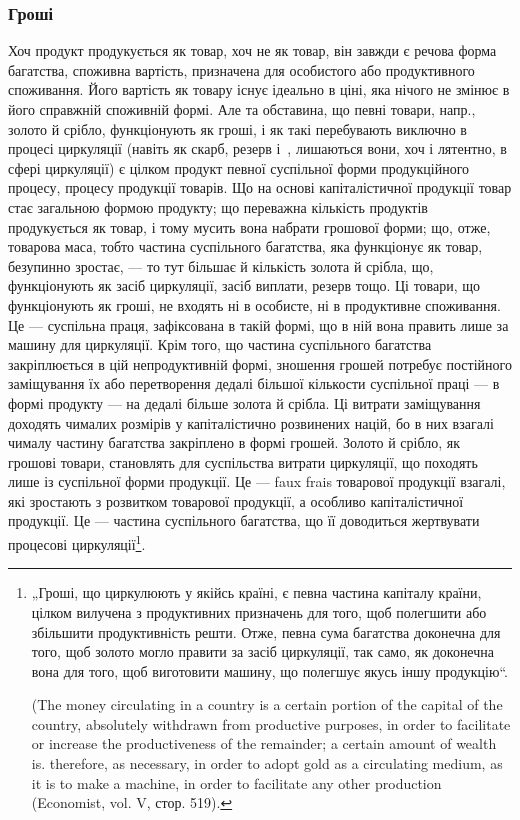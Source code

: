 \subsubsection{Гроші}

Хоч продукт продукується як товар, хоч не як товар, він завжди є
речова форма багатства, споживна вартість, призначена для особистого
або продуктивного споживання. Його вартість як товару існує ідеально
в ціні, яка нічого не змінює в його справжній споживній формі. Але та
обставина, що певні товари, напр., золото й срібло, функціонують як
гроші, і як такі перебувають виключно в процесі циркуляції (навіть як
скарб, резерв і~, лишаються вони, хоч і лятентно, в сфері
циркуляції) є цілком продукт певної суспільної форми продукційного
процесу, процесу продукції товарів. Що на основі капіталістичної продукції
товар стає загальною формою продукту; що переважна кількість
продуктів продукується як товар, і тому мусить вона набрати грошової
форми; що, отже, товарова маса, тобто частина суспільного багатства,
яка функціонує як товар, безупинно зростає, — то тут більшає й кількість
золота й срібла, що, функціонують як засіб циркуляції, засіб виплати,
резерв тощо. Ці товари, що функціонують як гроші, не входять ні в
особисте, ні в продуктивне споживання. Це — суспільна праця, зафіксована
в такій формі, що в ній вона править лише за машину для циркуляції.
Крім того, що частина суспільного багатства закріплюється в цій
непродуктивній формі, зношення грошей потребує постійного заміщування
їх або перетворення дедалі більшої кількости суспільної праці — в
формі продукту — на дедалі більше золота й срібла. Ці витрати заміщування
доходять чималих розмірів у капіталістично розвинених націй, бо
в них взагалі чималу частину багатства закріплено в формі грошей.
Золото й срібло, як грошові товари, становлять для суспільства витрати
циркуляції, що походять лише із суспільної форми продукції. Це — faux frais
товарової продукції взагалі, які зростають з розвитком товарової продукції,
а особливо капіталістичної продукції. Це — частина суспільного
багатства, що її доводиться жертвувати процесові циркуляції\footnote{
„Гроші, що циркулюють у якійсь країні, є певна частина капіталу
країни, цілком вилучена з продуктивних призначень для того, щоб полегшити
або збільшити продуктивність решти. Отже, певна сума багатства доконечна
для того, щоб золото могло правити за засіб циркуляції, так само, як доконечна
вона для того, щоб виготовити машину, що полегшує якусь іншу
продукцію“.

(The money circulating in a country is a certain portion of the capital of the
country, absolutely withdrawn from productive purposes, in order to facilitate
or increase the productiveness of the remainder; a certain amount of wealth
is. therefore, as necessary, in order to adopt gold as a circulating medium,
as it is to make a machine, in order to facilitate any other production (Economist,
vol. V, стор. 519).
}.

